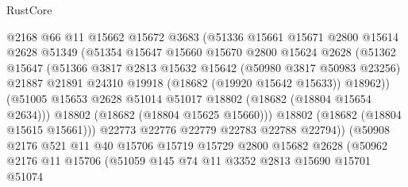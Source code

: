 \begin{lexlean}{RustCore}
\begin{coremodule}
                        @2168
                        @66
                        @11
                        @15662
                        @15672
                        @3683
                        (@51336
                          @15661
                          @15671
                          @2800
                          @15614
                          @2628
                          @51349
                          (@51354
                            @15647
                            @15660
                            @15670
                            @2800
                            @15624
                            @2628
                            (@51362
                              @15647
                              (@51366
                                @3817
                                @2813
                                @15632
                                @15642
                                (@50980 @3817 @50983 @23256)
                                @21887
                                @21891
                                @24310
                                @19918
                                (@18682 (@19920 @15642 @15633))
                                @18962))
                            (@51005
                              @15653
                              @2628
                              @51014
                              @51017
                              @18802
                              (@18682 (@18804 @15654 @2634)))
                            @18802
                            (@18682 (@18804 @15625 @15660)))
                          @18802
                          (@18682 (@18804 @15615 @15661)))
                        @22773
                        @22776
                        @22779
                        @22783
                        @22788
                        @22794))
                    (@50908
                      @2176
                      @521
                      @11
                      @40
                      @15706
                      @15719
                      @15729
                      @2800
                      @15682
                      @2628
                      (@50962
                        @2176
                        @11
                        @15706
                        (@51059
                          @145
                          @74
                          @11
                          @3352
                          @2813
                          @15690
                          @15701
                          @51074

\end{coremodule}
\end{lexlean}
